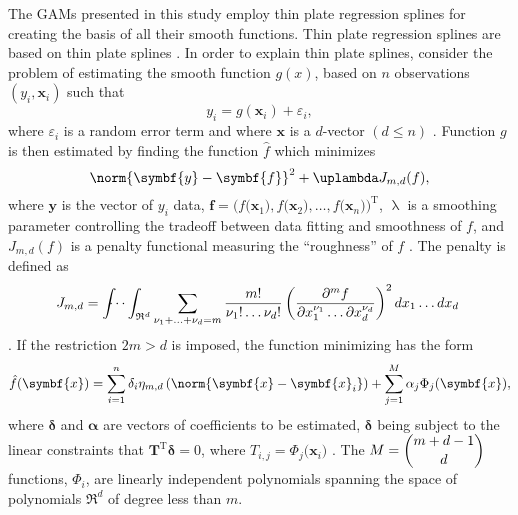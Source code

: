 The GAMs presented in this study employ thin plate regression splines \parencite{Wood2003} for creating the basis of all their smooth functions.  Thin plate regression splines are based on thin plate splines \parencite{Duchon1977}.  In order to explain thin plate splines, consider the problem of estimating the smooth function \(g(x)\), based on \(n\) observations \((y_i, \symbf{x}_i)\) such that
\begin{equation}
  \label{eq:ThinPlateSplinesModel}
  y_i = g(\symbf{x}_i) + \varepsilon_i,
\end{equation}
where \(\varepsilon_i\) is a random error term and where \(\symbf{x}\) is a \(d\)-vector \((d \leq n)\) \parencite{Wood2006}.  Function \(g\) is then estimated by finding the function \(\hat{f}\) which minimizes
\begin{equation}
  \label{eq:ThinPlateSplinesTermToMinimize}
  \norm{\symbf{y} - \symbf{f}}^2 + \uplambda J_{m, d}(f),
\end{equation}
where \(\symbf{y}\) is the vector of \(y_i\) data, \(\symbf{f} = \bigl(f\bigl(\symbf{x}_1\bigr), f\bigl(\symbf{x}_2\bigr), \ldots, f\bigl(\symbf{x}_n\bigr)\bigr)^{\text{T}}\), \(\uplambda\) is a smoothing parameter controlling the tradeoff between data fitting and smoothness of \(f\), and \(J_{m, d}(f)\) is a penalty functional measuring the ``roughness'' of \(f\) \parencite{Wood2006}.  The penalty is defined as
\begin{equation}
  \label{eq:ThinPlateSplinesPenalty}
  J_{m, d} = \int{\hspace{-3mm}}\cdots\int_{\mathfrak{R}^d} \sum_{\nu_1 + \ldots + \nu_d = m}\frac{m!}{\nu_1! \ldots \nu_d!} \left(\frac{\partial^mf}{\partial x_1^{\nu_1} \ldots \partial x_d^{\nu_d}}\right)^2 dx_1 \ldots dx_d~
\end{equation}
\parencite{Wood2006}.  If the restriction \(2m > d\) is imposed, the function minimizing  has the form
\begin{equation}
  \label{eq:ThinPlateSplinesMinimizingFunctionForm}
  \hat{f}(\symbf{x}) = \sum_{i = 1}^n \delta_i\eta_{m, d}\left(\norm{\symbf{x} - \symbf{x}_i}\right) + \sum_{j = 1}^M\alpha_j\Phi_j(\symbf{x}),
\end{equation}
where \(\symbf{\delta}\) and \(\symbf{\alpha}\) are vectors of coefficients to be estimated, \(\symbf{\delta}\) being subject to the linear constraints that \(\symbf{T}^{\text{T}}\symbf{\delta} = 0\), where \(T_{i, j} = \Phi_j\bigl(\symbf{x}_i\bigr)\) \parencite{Wood2006}.
The \(M = \dbinom{m + d - 1}{d}\) functions, \(\Phi_i\), are linearly independent polynomials spanning the space of polynomials \(\mathfrak{R}^d\) of degree less than \(m\).  %
